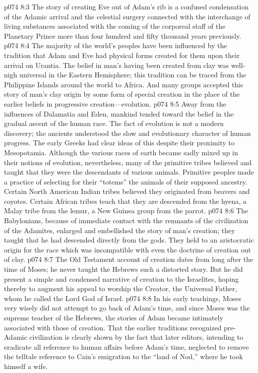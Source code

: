 \vs p074 8:3 The story of creating Eve out of Adam’s rib is a confused condensation of the Adamic arrival and the celestial surgery connected with the interchange of living substances associated with the coming of the corporeal staff of the Planetary Prince more than four hundred and fifty thousand years previously.
\pc \vs p074 8:4 The majority of the world’s peoples have been influenced by the tradition that Adam and Eve had physical forms created for them upon their arrival on Urantia. The belief in man’s having been created from clay was well\hyp{}nigh universal in the Eastern Hemisphere; this tradition can be traced from the Philippine Islands around the world to Africa. And many groups accepted this story of man’s clay origin by some form of special creation in the place of the earlier beliefs in progressive creation---evolution.
\vs p074 8:5 Away from the influences of Dalamatia and Eden, mankind tended toward the belief in the gradual ascent of the human race. The fact of evolution is not a modern discovery; the ancients understood the slow and evolutionary character of human progress. The early Greeks had clear ideas of this despite their proximity to Mesopotamia. Although the various races of earth became sadly mixed up in their notions of evolution, nevertheless, many of the primitive tribes believed and taught that they were the descendants of various animals. Primitive peoples made a practice of selecting for their “totems” the animals of their supposed ancestry. Certain North American Indian tribes believed they originated from beavers and coyotes. Certain African tribes teach that they are descended from the hyena, a Malay tribe from the lemur, a New Guinea group from the parrot.
\vs p074 8:6 The Babylonians, because of immediate contact with the remnants of the civilization of the Adamites, enlarged and embellished the story of man’s creation; they taught that he had descended directly from the gods. They held to an aristocratic origin for the race which was incompatible with even the doctrine of creation out of clay.
\pc \vs p074 8:7 The Old Testament account of creation dates from long after the time of Moses; he never taught the Hebrews such a distorted story. But he did present a simple and condensed narrative of creation to the Israelites, hoping thereby to augment his appeal to worship the Creator, the Universal Father, whom he called the Lord God of Israel.
\vs p074 8:8 In his early teachings, Moses very wisely did not attempt to go back of Adam’s time, and since Moses was the supreme teacher of the Hebrews, the stories of Adam became intimately associated with those of creation. That the earlier traditions recognized pre\hyp{}Adamic civilization is clearly shown by the fact that later editors, intending to eradicate all reference to human affairs before Adam’s time, neglected to remove the telltale reference to Cain’s emigration to the “land of Nod,” where he took himself a wife.
